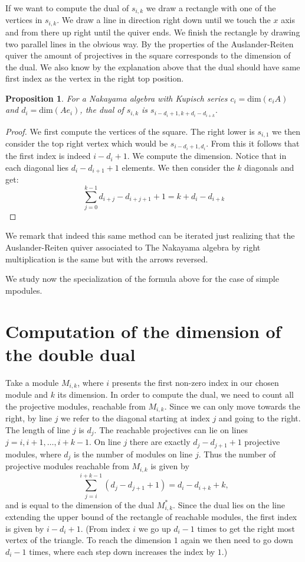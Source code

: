 \documentclass[12pt, a4paper]{article}
\numberwithin{equation}{section}
\theoremstyle{definition}
\theoremstyle{plain}
\newtheorem{proposition}[definition]{Proposition}
\theoremstyle{remark}
\begin{document}
If we want to compute the dual of $s_{i,k}$ we draw a rectangle with one of the vertices in $s_{i,k}.$ We draw a line in direction right down until we touch the $x$ axis and from there up right until the quiver ends. We finish the rectangle by drawing two parallel lines in the obvious way. By the properties of the Auslander-Reiten quiver the amount of projectives in the square corresponds to the dimension of the dual. We also know by the explanation above that the dual should have same first index as the vertex in the right top position.
\begin{proposition}
    For a Nakayama algebra with Kupisch series $c_i=\text{dim}(e_iA)$ and $d_i=\text{dim}(Ae_i)$, the dual of $s_{i,k}$ is $s_{i-d_i+1,k+d_i-d_{i+k}}.$
\end{proposition}
\begin{proof}
    We first compute the vertices of the square. The right lower is $s_{i,1}$ we then consider the top right vertex which would be $s_{i-d_{i}+1,d_{i}}.$ From this it follows that the first index is indeed $i-d_i+1.$ We compute the dimension. Notice that in each diagonal lies $d_{i}-d_{i+1}+1$ elements. We then consider the $k$ diagonals and get:
    $$\sum_{j=0}^{k-1} d_{i+j}-d_{i+j+1}+1=k+d_i-d_{i+k}$$
\end{proof}
We remark that indeed this same method can be iterated just realizing that the Auslander-Reiten quiver associated to The Nakayama algebra by right multiplication is the same but with the arrows reversed. 

We study now the specialization of the formula above for the case of simple mpodules.


\section{Computation of the dimension of the double dual}
Take a module $M_{i,k}$, where $i$ presents the first non-zero index in our chosen module and $k$ its dimension. 
In order to compute the dual, we need to count all the projective modules, reachable from $M_{i,k}$. 
Since we can only move towards the right, by line $j$ we refer to the diagonal starting at index $j$ and going to the right. The length of line $j$ is $d_j$.
The reachable projectives can lie on lines $j = i, i+1, \dots, i+k-1$.
On line $j$ there are exactly $d_j - d_{j+1} + 1$ projective modules, where $d_j$ is the number of modules on line $j$.
Thus the number of projective modules reachable from $M_{i,k}$ is given by
\begin{equation}
\label{eq:reachable}
\sum_{j=i}^{i+k-1} (d_j - d_{j+1} + 1) = d_i - d_{i+k} + k,
\end{equation}
and is equal to the dimension of the dual $M^*_{i,k}$.
Since the dual lies on the line extending the upper bound of the rectangle of reachable modules, the first index is given by $i - d_i + 1$.
(From index $i$ we go up $d_i - 1$ times to get the right most vertex of the triangle. To reach the dimension $1$ again we then need to go down $d_i - 1$ times, where each step down increases the index by $1$.)
\end{document}
